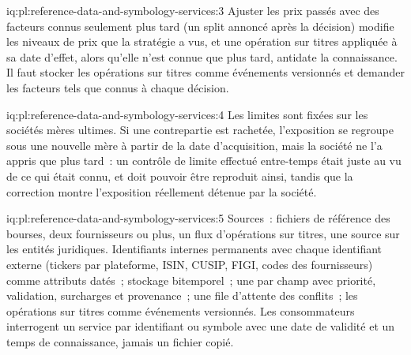 \begin{solution}{iq:pl:reference-data-and-symbology-services:3}
Ajuster les prix passés avec des facteurs connus seulement plus tard (un split annoncé après la décision) modifie les niveaux de prix que la stratégie a vus,
et une opération sur titres appliquée à sa date d'effet, alors qu'elle n'est connue que plus tard, antidate la connaissance.
Il faut stocker les opérations sur titres comme événements versionnés et demander les facteurs tels que connus à chaque décision.
\end{solution}

\begin{solution}{iq:pl:reference-data-and-symbology-services:4}
Les limites sont fixées sur les sociétés mères ultimes. Si une contrepartie est rachetée, l'exposition se regroupe sous une nouvelle mère à partir de la date
d'acquisition, mais la société ne l'a appris que plus tard~: un contrôle de limite effectué entre-temps était juste au vu de ce qui était connu, et doit pouvoir être reproduit ainsi,
tandis que la correction montre l'exposition réellement détenue par la société.
\end{solution}

\begin{solution}{iq:pl:reference-data-and-symbology-services:5}
Sources~: fichiers de référence des bourses, deux fournisseurs ou plus, un flux d'opérations sur titres, une source sur les entités juridiques. Identifiants internes permanents
avec chaque identifiant externe (tickers par plateforme, ISIN, CUSIP, FIGI, codes des fournisseurs) comme attributs datés~; stockage bitemporel~;
une  par champ avec priorité, validation, surcharges et provenance~; une file d'attente des conflits~; les opérations sur titres comme événements versionnés.
Les consommateurs interrogent un service par identifiant ou symbole avec une date de validité et un temps de connaissance, jamais un fichier copié.
\end{solution}
